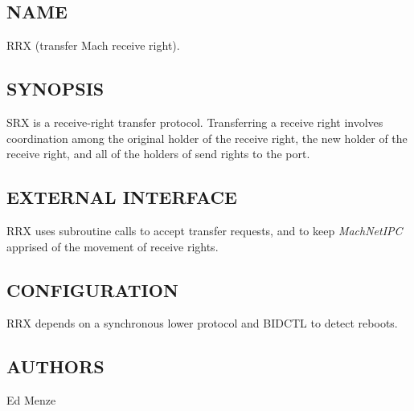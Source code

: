 %
%
%

\subsection*{NAME}

\noindent RRX (transfer Mach receive right).


\subsection*{SYNOPSIS}

SRX is a receive-right transfer protocol.  Transferring a receive
right involves coordination among the original holder of the receive
right, the new holder of the receive right, and all of the holders of
send rights to the port.

\noindent
\subsection*{EXTERNAL INTERFACE}

RRX uses subroutine calls to accept transfer requests, and to keep
{\em MachNetIPC} apprised of the movement of receive rights.

\subsection*{CONFIGURATION}

RRX depends on a synchronous lower protocol and BIDCTL to detect
reboots.


\subsection*{AUTHORS}

\noindent Ed Menze
